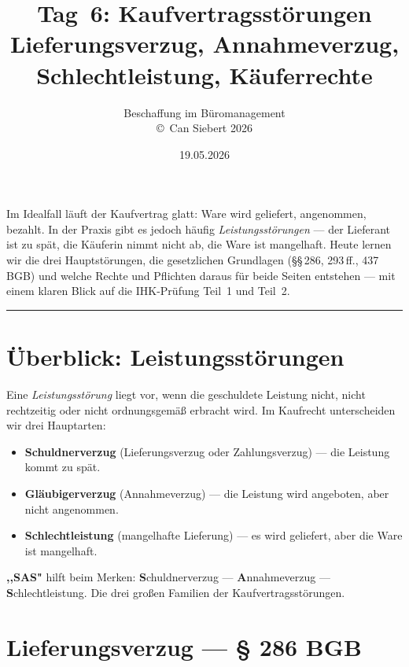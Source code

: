 \documentclass[11pt, a4paper]{article}
\title{\vspace*{-1.5cm}\Huge\bfseries\color{bfwPrimaryDark}Tag~6: Kaufvertragsstörungen\\[0.4em]
  \large\color{bfwInkSoft}\textnormal{Lieferungsverzug, Annahmeverzug, Schlechtleistung, Käuferrechte}}
\author{\textsf{Beschaffung im Büromanagement}\\
\textsf{\small\copyright\ Can Siebert\,\textperiodcentered\,2026}}
\date{19.05.2026}
\begin{document}
\maketitle
\thispagestyle{empty}

\vspace{1em}
\begin{merksatz}[title={\bfseries Worum geht es heute?}]
Im Idealfall läuft der Kaufvertrag glatt: Ware wird geliefert, angenommen, bezahlt.
In der Praxis gibt es jedoch häufig \emph{Leistungsstörungen} --- der Lieferant ist
zu spät, die Käuferin nimmt nicht ab, die Ware ist mangelhaft. Heute lernen wir die
drei Hauptstörungen, die gesetzlichen Grundlagen (§§\,286, 293\,ff., 437 BGB) und
welche Rechte und Pflichten daraus für beide Seiten entstehen --- mit einem klaren
Blick auf die IHK-Prüfung Teil~1 und Teil~2.
\end{merksatz}

\tableofcontents
\vspace{1em}
\hrule
\vspace{1em}

\section{Überblick: Leistungsstörungen}

Eine \emph{Leistungsstörung} liegt vor, wenn die geschuldete Leistung nicht, nicht
rechtzeitig oder nicht ordnungsgemäß erbracht wird. Im Kaufrecht unterscheiden wir
drei Hauptarten:

\begin{itemize}[itemsep=2pt]
  \item \textbf{Schuldnerverzug} (Lieferungsverzug oder Zahlungsverzug) --- die Leistung kommt zu spät.
  \item \textbf{Gläubigerverzug} (Annahmeverzug) --- die Leistung wird angeboten, aber nicht angenommen.
  \item \textbf{Schlechtleistung} (mangelhafte Lieferung) --- es wird geliefert, aber die Ware ist mangelhaft.
\end{itemize}

\begin{eselsbruecke}
\textbf{,,SAS"} hilft beim Merken: \textbf{S}chuldnerverzug --- \textbf{A}nnahmeverzug --- \textbf{S}chlechtleistung. Die drei großen Familien der Kaufvertragsstörungen.
\end{eselsbruecke}

\section{Lieferungsverzug --- § 286 BGB}
\end{document}
